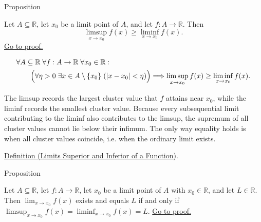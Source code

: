\NoLocalDependencies
\begin{propositionbox}{Proposition}
\begin{proposition}[$\limsup\geq\liminf$]
\label{prop:limsup-geq-liminf-function}
Let $A\subseteq \mathbb{R}$, let $x_0$ be a limit point of $A$, and let $f:A\to\mathbb{R}$. Then
\[
\limsup_{x\to x_0} f(x) \ge \liminf_{x\to x_0} f(x).
\]
\hyperref[prf:limsup-geq-liminf-function]{Go to proof.}
\end{proposition}
\end{propositionbox}

\begin{remark*}
\[
\begin{aligned}
&\forall A\subseteq\mathbb{R}\;\forall f:A\to\mathbb{R}\;\forall x_0\in\mathbb{R}:\\
&\qquad
\Bigl(\forall \eta>0\;\exists x\in A\setminus\{x_0\}\;(|x-x_0|<\eta)\Bigr)
\Longrightarrow
\limsup_{x\to x_0} f(x) \ge \liminf_{x\to x_0} f(x).
\end{aligned}
\]
\end{remark*}

\begin{remark*}[Interpretation]
The limsup records the largest cluster value that $f$ attains near $x_0$, while the liminf records the smallest cluster value. Because every subsequential limit contributing to the liminf also contributes to the limsup, the supremum of all cluster values cannot lie below their infimum. The only way equality holds is when all cluster values coincide, i.e. when the ordinary limit exists.
\end{remark*}

\begin{remark*}[Dependencies]
\hyperref[def:limsup-liminf-function]{Definition (Limits Superior and Inferior of a Function)}.
\end{remark*}

\begin{propositionbox}{Proposition}
\begin{proposition}[Limit Exists iff $\limsup=\liminf$]
\label{prop:limsup-liminf-limit-criterion}
Let $A \subseteq \mathbb{R}$, let $f \colon A \to \mathbb{R}$, let $x_0$ be a limit point of $A$ with $x_0 \in \mathbb{R}$, and let $L \in \mathbb{R}$. Then $\lim_{x \to x_0} f(x)$ exists and equals $L$ if and only if $\limsup_{x \to x_0} f(x) = \liminf_{x \to x_0} f(x) = L$.
\hyperref[prf:limsup-liminf-limit-criterion]{Go to proof.}
\end{proposition}
\end{propositionbox}

